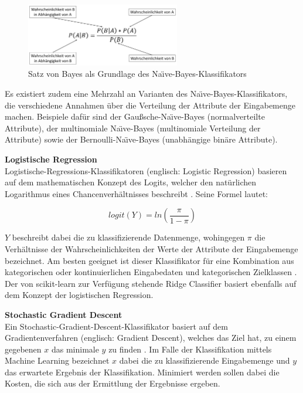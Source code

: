 \begin{figure}[H]
    \centering
    \includegraphics[width=0.6\textwidth]{images/NB}
    \caption{Satz von Bayes als Grundlage des Na\"{\i}ve-Bayes-Klassifikators\label{fig:nb}}
\end{figure}

Es existiert zudem eine Mehrzahl an Varianten des Na\"{\i}ve-Bayes-Klassifikators, die verschiedene Annahmen über die Verteilung der Attribute der Eingabemenge machen. Beispiele dafür sind der Gaußsche-Na\"{\i}ve-Bayes (normalverteilte Attribute), der multinomiale Na\"{\i}ve-Bayes (multinomiale Verteilung der Attribute) sowie der Bernoulli-Na\"{\i}ve-Bayes (unabhängige binäre Attribute).

\textbf{Logistische Regression\medskip}\\
Logistische-Regressions-Klassifikatoren (englisch: Logistic Regression) basieren auf dem mathematischen Konzept des Logits, welcher den natürlichen Logarithmus eines Chancenverhältnisses beschreibt \cite{Peng2002}. Seine Formel lautet:

\[logit(Y) = ln(\frac{\pi}{1-\pi})\]

$Y$ beschreibt dabei die zu klassifizierende Datenmenge, wohingegen $\pi$ die Verhältnisse der Wahrscheinlichkeiten der Werte der Attribute der Eingabemenge bezeichnet. Am besten geeignet ist dieser Klassifikator für eine Kombination aus kategorischen oder kontinuierlichen Eingabedaten und kategorischen Zielklassen \cite{Peng2002}. Der von scikit-learn zur Verfügung stehende Ridge Classifier basiert ebenfalls auf dem Konzept der logistischen Regression.

\textbf{Stochastic Gradient Descent\medskip}\\
Ein Stochastic-Gradient-Descent-Klassifikator basiert auf dem Gradientenverfahren (englisch: Gradient Descent), welches das Ziel hat, zu einem gegebenen $x$ das minimale $y$ zu finden \cite{Srinivasan2019}. Im Falle der Klassifikation mittels Machine Learning bezeichnet $x$ dabei die zu klassifizierende Eingabemenge und $y$ das erwartete Ergebnis der Klassifikation. Minimiert werden sollen dabei die \glqq Kosten\grqq{}, die sich aus der Ermittlung der Ergebnisse ergeben.

